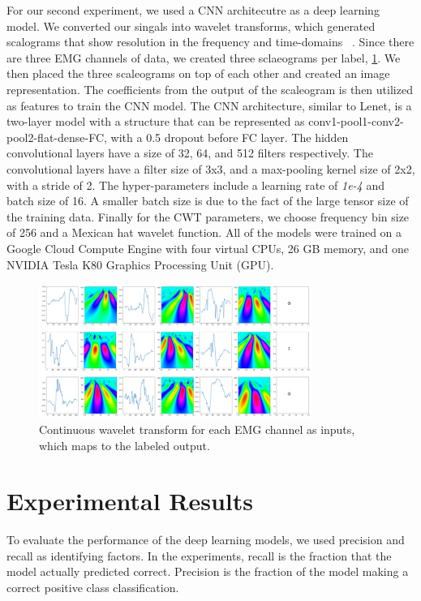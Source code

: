 \documentclass[conference]{IEEEtran}
\begin{document}
For our second experiment, we used a CNN architecutre as a deep learning model. We converted our singals into wavelet transforms, which generated scalograms that show resolution in the frequency and time-domains ~\cite{wletCNN}. Since there are three EMG channels of data, we created three sclaeograms per label, \figurename \ref{fig: wavelet_signals}. We then placed the three scaleograms on top of each other and created an image representation. The coefficients from the output of the scaleogram is then utilized as features to train the CNN model. The CNN architecture, similar to Lenet, is a two-layer model with a structure that can be represented as conv1-pool1-conv2-pool2-flat-dense-FC, with a  0.5 dropout before FC layer. The hidden convolutional layers have a size of 32, 64, and 512 filters respectively. The convolutional layers have a filter size of 3x3, and a max-pooling kernel size of 2x2, with a stride of 2. The hyper-parameters include a learning rate of \textit{1e-4} and batch size of 16. A smaller batch size is due to the fact of the large tensor size of the training data. Finally for the CWT parameters, we choose frequency bin size of 256 and a Mexican hat wavelet function. All of the models were trained on a Google Cloud Compute Engine with four virtual CPUs, 26 GB memory, and one NVIDIA Tesla K80 Graphics Processing Unit (GPU).

\begin{figure}[!tb]
\centering
\includegraphics[width=3.5in]{images/wavelet_signal.png}
\caption{Continuous wavelet transform for each EMG channel as inputs, which maps to the labeled output.}
\label{fig: wavelet_signals}
\end{figure}


\section{Experimental Results}

To evaluate the performance of the deep learning models, we used precision and recall as identifying factors. In the experiments, recall is the fraction that the model actually predicted correct. Precision is the fraction of the model making a correct positive class classification.
\end{document}
